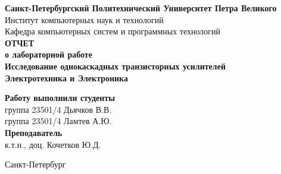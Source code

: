 \begin{titlepage}	%

	\begin{center}		%

		 \textbf{Санкт-Петербургский Политехнический Университет Петра Великого}\\[0.3cm]
		 \small Институт компьютерных наук и технологий \\[0.3cm]
		 \small Кафедра компьютерных систем и программных технологий\\[4cm]
		
		 \textbf{ОТЧЕТ}\\ \textbf{о лабораторной работе}\\[0.5cm]
		 \textbf{Исследование однокаскадных транзисторных усилителей}\\[0.1cm]
		 \textbf{Электротехника и Электроника}\\[10cm]

	\end{center}


	\begin{flushright} %
		\begin{minipage}{0.60\textwidth} %
			\begin{flushleft} %

				 \small \textbf{Работу выполнили студенты}\\[3mm]
				 \small группа 23501/4\hspace*{17mm}   Дьячков В.В.\\[3mm]
				 \small группа 23501/4\hspace*{17mm}   Ламтев А.Ю.\\[5mm]
				
				\small \textbf{Преподаватель}\\[5mm]
			 	\small \sign[3.5cm]   \hspace*{8mm} к.т.н., доц. Кочетков Ю.Д.\\[0.5cm]

			\end{flushleft}
		\end{minipage}
	\end{flushright}
	
	\vfill %

	\begin{center}
	\small Санкт-Петербург\\
	\small \the\year %
	\end{center} %

\thispagestyle{empty} %
\end{titlepage} %

\vfill %
